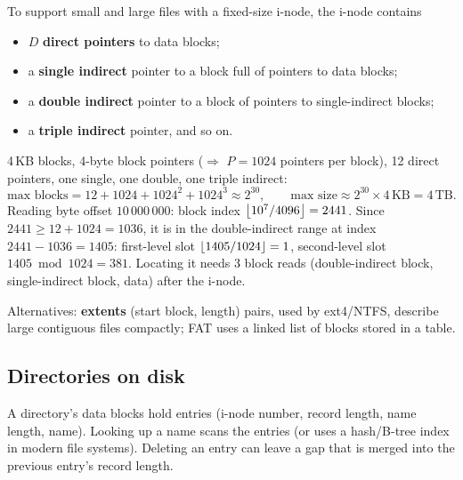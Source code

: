 \begin{definition}
To support small and large files with a fixed-size i-node, the i-node contains
\begin{itemize}
  \item $D$ \textbf{direct pointers} to data blocks;
  \item a \textbf{single indirect} pointer to a block full of pointers to data blocks;
  \item a \textbf{double indirect} pointer to a block of pointers to single-indirect blocks;
  \item a \textbf{triple indirect} pointer, and so on.
\end{itemize}
\end{definition}

\begin{example}
4\,KB blocks, 4-byte block pointers ($\Rightarrow$ $P = 1024$ pointers per block), 12 direct
pointers, one single, one double, one triple indirect:
\[
  \text{max blocks} = 12 + 1024 + 1024^2 + 1024^3 \approx 2^{30}, \qquad
  \text{max size} \approx 2^{30} \times 4\,\text{KB} = 4\,\text{TB}.
\]
Reading byte offset $10\,000\,000$: block index $\left\lfloor 10^{7}/4096 \right\rfloor = 2441$. Since
$2441 \ge 12 + 1024 = 1036$, it is in the double-indirect range at index $2441 - 1036 = 1405$:
first-level slot $\left\lfloor 1405/1024 \right\rfloor = 1$, second-level slot $1405 \bmod 1024 = 381$. Locating it
needs 3 block reads (double-indirect block, single-indirect block, data) after the i-node.
\end{example}

Alternatives: \textbf{extents} (start block, length) pairs, used by ext4/NTFS, describe large
contiguous files compactly; FAT uses a linked list of blocks stored in a table.

\subsection{Directories on disk}
A directory's data blocks hold entries (i-node number, record length, name length, name).
Looking up a name scans the entries (or uses a hash/B-tree index in modern file systems).
Deleting an entry can leave a gap that is merged into the previous entry's record length.

